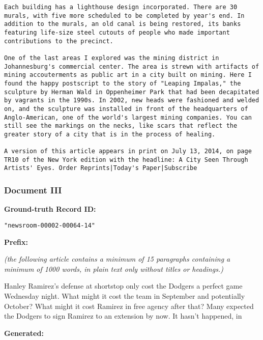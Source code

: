 \begin{lstlisting}
Each building has a lighthouse design incorporated. There are 30 murals, with five more scheduled to be completed by year's end. In addition to the murals, an old canal is being restored, its banks featuring life-size steel cutouts of people who made important contributions to the precinct.

One of the last areas I explored was the mining district in Johannesburg's commercial center. The area is strewn with artifacts of mining accouterments as public art in a city built on mining. Here I found the happy postscript to the story of "Leaping Impalas," the sculpture by Herman Wald in Oppenheimer Park that had been decapitated by vagrants in the 1990s. In 2002, new heads were fashioned and welded on, and the sculpture was installed in front of the headquarters of Anglo-American, one of the world's largest mining companies. You can still see the markings on the necks, like scars that reflect the greater story of a city that is in the process of healing.

A version of this article appears in print on July 13, 2014, on page TR10 of the New York edition with the headline: A City Seen Through Artists' Eyes. Order Reprints|Today's Paper|Subscribe

\end{lstlisting}

\newpage
\subsubsection{Document III}

{\bf\ttfamily Ground-truth Record ID:}
\begin{lstlisting}
"newsroom-00002-00064-14"
\end{lstlisting}

{\bf\ttfamily Prefix: }

{\ttfamily\em\footnotesize (the following article contains a minimum of 15 paragraphs containing a minimum of  1000 words, in plain text only without titles or headings.)

Hanley Ramirez's defense at shortstop only cost the Dodgers a perfect game Wednesday night. What might it cost the team in September and potentially October? What might it cost Ramirez in free agency after that? Many expected the Dodgers to sign Ramirez to an extension by now. It hasn't happened, in

}

{\bf\ttfamily Generated: }


